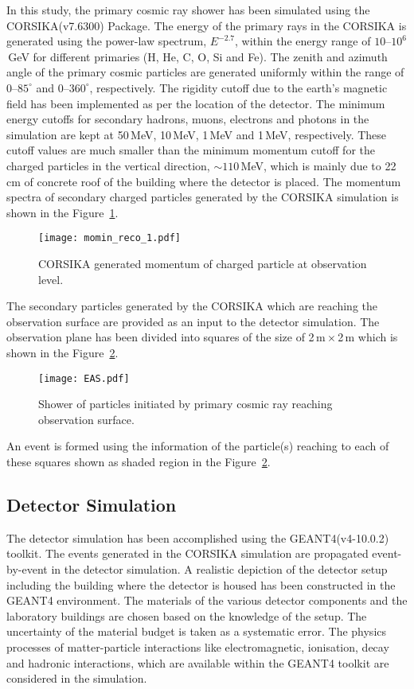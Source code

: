 In this study, the primary cosmic ray shower has been simulated using
the CORSIKA(v7.6300) Package. The energy of the primary rays in the
CORSIKA is generated using the power-law spectrum, $E^{-2.7}$, within
the energy range of \mbox{$10$--$10^{6}$\,GeV} for different primaries
(H, He, C, O, Si and Fe). The zenith and azimuth angle of the primary
cosmic particles are generated uniformly within the range of
\mbox{$0$--$85^\circ$} and \mbox{$0$--$360^\circ$}, respectively. The
rigidity cutoff due to the earth's magnetic field has been implemented
as per the location of the detector. The minimum energy cutoffs for
secondary hadrons, muons, electrons and photons in the simulation are
kept at 50\,MeV, 10\,MeV, 1\,MeV and 1\,MeV, respectively. These cutoff
values are much smaller than the minimum momentum cutoff for
the charged particles in the vertical direction,
\mbox{$\sim 110$\,MeV}, which is mainly due to 22\,cm of concrete
roof of the building where the detector is placed. The momentum
spectra of secondary charged particles generated by the CORSIKA
simulation is shown in the Figure~\ref{fig:momin}.
\begin{figure}[h]
  \centering
  \texttt{[image: momin\_reco\_1.pdf]} 
  \caption{CORSIKA generated momentum of charged particle at observation level.}
  \label{fig:momin}
\end{figure}

The secondary particles generated by the CORSIKA which are reaching
the observation surface are provided as an input to the detector
simulation. The observation plane has been divided
into squares of the size of 2\,m\,$\times$\,2\,m which is shown in the
Figure~\ref{fig:eas}.
\begin{figure}[h]
  \centering
  \texttt{[image: EAS.pdf]} 
  \caption{Shower of particles initiated by primary cosmic ray
    reaching observation surface.}
  \label{fig:eas}
\end{figure}
An event is formed using the information of the particle(s) reaching
to each of these squares shown as shaded region in the
Figure~\ref{fig:eas}.


\subsection{Detector Simulation}
The detector simulation has been accomplished using the
GEANT4(v4-10.0.2) toolkit. The events generated in the CORSIKA
simulation are propagated event-by-event in the detector simulation.
A realistic depiction of the detector setup including the building
where the detector is housed has been constructed in the GEANT4
environment. The materials of the various detector components and
the laboratory buildings are chosen based on the knowledge of the
setup. The uncertainty of the material budget is taken as a systematic
error. The physics processes of matter-particle interactions 
like electromagnetic, ionisation, decay and hadronic interactions,
which are available within the GEANT4 toolkit are considered in the
simulation.

